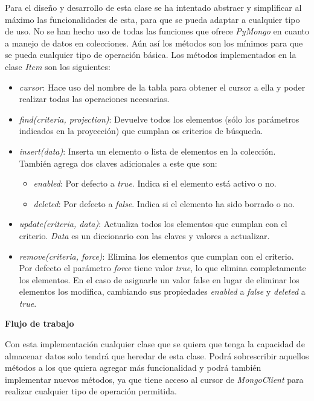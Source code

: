 \bigskip
Para el diseño y desarrollo de esta clase se ha intentado abstraer y simplificar al máximo las funcionalidades de esta, para que se pueda adaptar a cualquier tipo de uso. No se han hecho uso de todas las funciones que ofrece \textit{PyMongo} en cuanto a manejo de datos en colecciones. Aún así los métodos son los mínimos para que se pueda cualquier tipo de operación básica. Los métodos implementados en la clase \textit{Item} son los siguientes:
\begin{itemize}
	\item \textit{cursor}: Hace uso del nombre de la tabla para obtener el cursor a ella y poder realizar todas las operaciones necesarias.
	\item \textit{find(criteria, projection)}: Devuelve todos los elementos (sólo los parámetros indicados en la proyección) que cumplan os criterios de búsqueda.
	\item \textit{insert(data)}: Inserta un elemento o lista de elementos en la colección. También agrega dos claves adicionales a este que son:
	\begin{itemize}
		\item \textit{enabled}: Por defecto a \textit{true}. Indica si el elemento está activo o no.
		\item \textit{deleted}: Por defecto a \textit{false}. Indica si el elemento ha sido borrado o no.
	\end{itemize}
	\item \textit{update(criteria, data)}: Actualiza todos los elementos que cumplan con el criterio. \textit{Data} es un diccionario con las claves y valores a actualizar.
	\item \textit{remove(criteria, force)}: Elimina los elementos que cumplan con el criterio. Por defecto el parámetro \textit{force} tiene valor \textit{true}, lo que elimina completamente los elementos. En el caso de asignarle un valor false en lugar de eliminar los elementos los modifica, cambiando sus propiedades \textit{enabled} a \textit{false} y \textit{deleted} a \textit{true}.
\end{itemize}


\bigskip
\textbf{Flujo de trabajo}

Con esta implementación cualquier clase que se quiera que tenga la capacidad de almacenar datos solo tendrá que heredar de esta clase. Podrá sobrescribir aquellos métodos a los que quiera agregar más funcionalidad y podrá también implementar nuevos métodos, ya que tiene acceso al cursor de \textit{MongoClient} para realizar cualquier tipo de operación permitida.


